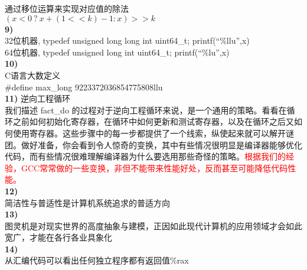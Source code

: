 \documentclass{article}
\newcommand{\red}[1]{\textcolor{red}{#1}}
\begin{document}
\begin{CJK}{UTF8}{uyhei}
通过移位运算来实现对应值的除法	\\
$(x<0\ ?\ x+(1<<k)-1 : x) >> k$	\\[1ex]
\newpage
\noindent\textbf{9)}	\\
32位机器, typedef unsigned long long int uint64\_t; printf(``\%llu'',x)	\\
64位机器, typedef unsigned long int uint64\_t; printf(``\%lu'',x)	\\
\textbf{10)}	\\
C语言大数定义	\\
\#define max\_long 9223372036854775808llu	\\
\textbf{11)}
逆向工程循环	\\
我们描述 fact\_do 的过程对于逆向工程循环来说，是一个通用的策略。看看在循环之前如何初始化寄存器，在循环中如何更新和测试寄存器，以及在循环之后又如何使用寄存器。这些步骤中的每一步都提供了一个线索，纵使起来就可以解开谜团。做好准备，你会看到令人惊奇的变换，其中有些情况很明显是编译器能够优化代码，而有些情况很难理解编译器为什么要选用那些奇怪的策略。\red{根据我们的经验，GCC常常做的一些变换，非但不能带来性能好处，反而甚至可能降低代码性能。}	\\
\textbf{12)}	\\
简洁性与普适性是计算机系统追求的普适方向	\\
\textbf{13)}	\\
图灵机是对现实世界的高度抽象与建模，正因如此现代计算机的应用领域才会如此宽广，才能在各行各业具象化	\\
\textbf{14)}	\\
从汇编代码可以看出任何独立程序都有返回值\%rax	\\




\end{CJK}
\end{document}
